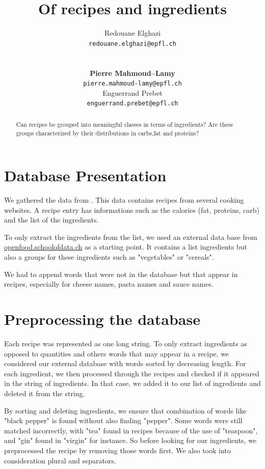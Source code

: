 \documentclass[11pt]{article}
\title{Of recipes and ingredients}
\author{Redouane Elghazi \\
  {\tt redouane.elghazi@epfl.ch} \\\And
  \\\\\textbf{Pierre Mahmoud--Lamy} \\
  {\tt pierre.mahmoud-lamy@epfl.ch} \\\And
Enguerrand Prebet \\
{\tt enguerrand.prebet@epfl.ch} \\}
\date{}
\begin{document}
\maketitle
\begin{abstract}
	
	Can recipes be grouped into meaningful classes in terms of ingredients? Are these groups characterized by their distributions in carbs,fat and proteins?
\end{abstract}

\section{Database Presentation}
We gathered the data from . This data contains recipes from several cooking websites. A recipe entry has informations such as the calories (fat, proteins, carb) and the list of the ingredients. 

To only extract the ingredients from the list, we used an external data base from \href{http://openfood.schoolofdata.ch}{openfood.schoolofdata.ch} as a starting point. It contains a list ingredients but also a groups for these ingredients such as "vegetables" or "cereals".

We had to append words that were not in the database but that appear in recipes, especially for cheese names, pasta names and sauce names.

\section{Preprocessing the database}
Each recipe was represented as one long string. To only extract ingredients as opposed to quantities and others words that may appear in a recipe, we considered our external database with words sorted by decreasing length. For each ingredient, we then processed through the recipes and checked if it appeared in the string of ingredients. In that case, we added it to our list of ingredients and deleted it from the string.

By sorting and deleting ingredients, we ensure that combination of words like "black pepper" is found without also finding "pepper". Some words were still matched incorrectly, with "tea" found in recipes because of the use of "teaspoon", and "gin" found in "virgin" for instance. So before looking for our ingredients, we preprocessed the recipe by removing those words first.
We also took into consideration plural and separators.
\end{document}
